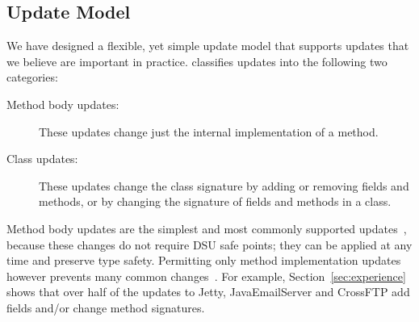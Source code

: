 
\subsection{Update Model}
\label{sec:updates}

We have designed a
flexible, yet simple update model that supports updates that we
believe are important in practice.  \DSU{} classifies updates into the
following two categories:

\begin{description}

\item[Method body updates:] These updates change just the internal
implementation of a method.
  
\item[Class updates:] These updates change the class signature by adding
or removing fields and methods, or by changing the signature of fields and
methods in a class.

\end{description}

\noindent 
Method body updates are the simplest and most commonly supported
updates~\cite{JVMhotswap,VSEnC,eaddy05enc,GilmoreKW97,orso:java,K42reconfig,HjalmtyssonG98},
because these changes do not require DSU safe points; they can be
applied at any time and preserve type safety.
Permitting only method implementation updates however prevents many
common changes~\cite{neamtiu05evolution}.  For example,
Section~\ref{sec:experience} shows that over half of the updates to
Jetty, JavaEmailServer and CrossFTP add fields and/or change
method signatures.



